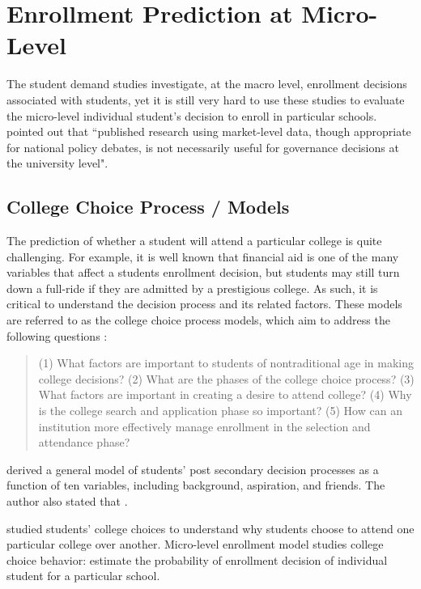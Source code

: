 \documentclass[12pt,english]{report}
\begin{document}
\section{Enrollment Prediction at Micro-Level}
The student demand studies investigate, at the macro level, enrollment decisions associated with students, yet it is still very hard to use these studies to evaluate the micro-level individual student's decision to enroll in particular schools. \citet{Carter2011} pointed out that ``published research using market-level data, though appropriate for national policy debates, is not necessarily useful for governance decisions at the university level".

\subsection{College Choice Process / Models} 
The prediction of whether a student will attend a particular college is quite challenging.  For example,  it is well known that financial aid is one of the many variables that affect a students enrollment decision, but students may still turn down a full-ride
if they are admitted by a prestigious college.  As such, it is critical to understand the decision process and its related factors. These models are referred to as the college choice process models, which aim to address the following questions \citep{Paulsen1990}:
\begin{quote}
(1) What factors are important to students of nontraditional age in making college decisions? (2) What are the phases of the college choice process? (3) What factors are important in creating a desire to attend college? (4) Why is the college search and application phase so important? (5) How can an institution more effectively manage enrollment in the selection and attendance phase?
\end{quote}

\citet{Jackson1978} derived a general model of students' post secondary decision processes as a function of ten variables, 
including background, aspiration, and friends. The author also stated that .

\citet{Paulsen1990} studied students' college choices to understand why students choose to attend one particular college over 
another.  Micro-level enrollment model studies college choice behavior: estimate the probability of enrollment decision of 
individual student for a particular school.
\end{document}
